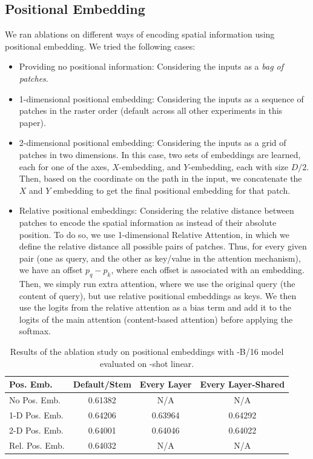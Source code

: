 \subsection{Positional Embedding}
\label{app:pos_emb}

We ran ablations on different ways of encoding spatial information using positional embedding. We tried the following cases:
\begin{itemize}
    \item Providing no positional information: Considering the inputs as a \emph{bag of patches}.
    \item 1-dimensional positional embedding: Considering the inputs as a sequence of patches in the raster order (default across all other experiments in this paper).
    \item 2-dimensional positional embedding: Considering the inputs as a grid of patches in two dimensions. In this case, two sets of embeddings are learned, each for one of the axes, $X$-embedding, and $Y$-embedding, each with size $D/2$. Then, based on the coordinate on the path in the input, we concatenate the $X$ and $Y$ embedding to get the final positional embedding for that patch.
    \item Relative positional embeddings:  Considering the relative distance between patches to encode the spatial information as instead of their absolute position. To do so, we use 1-dimensional Relative Attention, in which we define the relative distance all possible pairs of patches. Thus, for every given pair (one as query, and the other as key/value in the attention mechanism), we have an offset $p_{q}-p_{k}$, where each offset is associated with an embedding. Then, we simply run extra attention, where we use the original query (the content of query), but use relative positional embeddings as keys. We then use the logits from the relative attention as a bias term and add it to the logits of the main attention (content-based attention) before applying the softmax. 
\end{itemize}



\begin{table}[t]
\centering
\begin{tabular}{l c c c}
\toprule
Pos. Emb. & Default/Stem & Every Layer & Every Layer-Shared \\
\midrule
No Pos. Emb. & 0.61382  & N/A & N/A \\
1-D Pos. Emb. & 0.64206 & 0.63964 & 0.64292 \\
2-D Pos. Emb. &  0.64001 & 0.64046  & 0.64022 \\
Rel. Pos. Emb. & 0.64032 & N/A & N/A \\
\bottomrule
\end{tabular}
\caption{Results of the ablation study on positional embeddings with \oursabbrv-B/16 model evaluated on -shot linear.}
\label{tbl:pos_emb_abblation}
\end{table}

